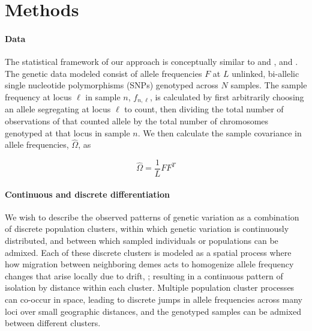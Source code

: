 \documentclass[12pt]{article}
\newcommand{\gc}[1]{{\it\color{blue}{(#1)}}}
\begin{document}
\section*{Methods}
\paragraph{Data}
The statistical framework of our approach is conceptually similar to \cite{Wasser2004} and \cite{BEDASSLE}, and \cite{spacemix}.
The genetic data modeled consist of allele frequencies $F$ at $L$ unlinked, bi-allelic single nucleotide polymorphisms (SNPs) genotyped across $N$ samples.
The sample frequency at locus $\ell$ in sample $n$, $f_{n,\ell}$, is calculated by first arbitrarily choosing an allele segregating 
at locus $\ell$ to count, 
then dividing the total number of observations of that counted allele by the total number of chromosomes genotyped at that locus
in sample $n$.
We then calculate the sample covariance in allele frequencies, $\widehat{\Omega}$, as

\begin{equation}
\widehat{\Omega} = \frac{1}{L}  FF^T
\label{sample_covariance}
\end{equation}
\gc{SO IS THIS ACTUALLY the calc given the new diagonal?}


\paragraph{Continuous and discrete differentiation}
We wish to describe the observed patterns of genetic variation as a combination of 
discrete population clusters,
within which genetic variation is continuously distributed, 
and between which sampled individuals or populations can be admixed.
Each of these discrete clusters is modeled as a spatial process where
\gc{allele frequencies covary between geographically close locations,
  but  %
this covariance is allowed to decay with geographic distance. This 
pattern of spatial decay reflects} how migration between neighboring demes acts 
to homogenize allele frequency changes that arise locally due to
drift, \gc{but that migration is less effective at homogenizing
  between geographic distance demes};
resulting in a continuous pattern of isolation by distance within each cluster.
Multiple population cluster processes can co-occur in space, 
leading to discrete jumps in allele frequencies across many loci over small geographic distances,
and the genotyped samples can be admixed between different clusters.
\end{document}
